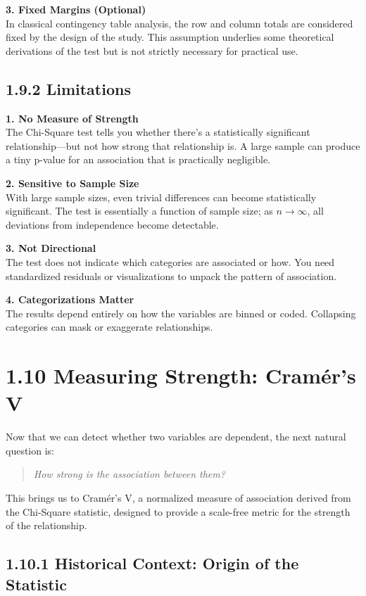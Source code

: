 \documentclass[12pt]{article}
\begin{document}
\textbf{3. Fixed Margins (Optional)} \\
In classical contingency table analysis, the row and column totals are considered fixed by the design of the study. This assumption underlies some theoretical derivations of the test but is not strictly necessary for practical use.

\subsection*{1.9.2 Limitations}

\textbf{1. No Measure of Strength} \\
The Chi-Square test tells you whether there’s a statistically significant relationship—but not how strong that relationship is. A large sample can produce a tiny p-value for an association that is practically negligible.

\textbf{2. Sensitive to Sample Size} \\
With large sample sizes, even trivial differences can become statistically significant. The test is essentially a function of sample size; as \(n \to \infty\), all deviations from independence become detectable.

\textbf{3. Not Directional} \\
The test does not indicate which categories are associated or how. You need standardized residuals or visualizations to unpack the pattern of association.

\textbf{4. Categorizations Matter} \\
The results depend entirely on how the variables are binned or coded. Collapsing categories can mask or exaggerate relationships.

\section*{1.10 Measuring Strength: Cramér’s V}

Now that we can detect whether two variables are dependent, the next natural question is:

\begin{quote}
\textit{How strong is the association between them?}
\end{quote}

This brings us to Cramér’s V, a normalized measure of association derived from the Chi-Square statistic, designed to provide a scale-free metric for the strength of the relationship.

\subsection*{1.10.1 Historical Context: Origin of the Statistic}
\end{document}

